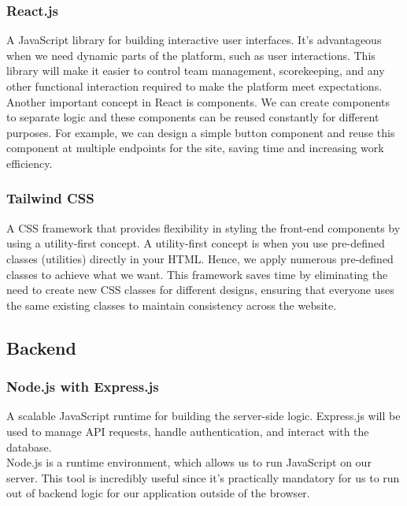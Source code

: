 \documentclass{article}
\begin{document}
\subsubsection*{React.js}

A JavaScript library for building interactive user interfaces. It's advantageous when we need dynamic parts of the platform, such as user interactions. This library will make it easier to control team management, scorekeeping, and any other functional interaction required to make the platform meet expectations. \\

\noindent Another important concept in React is components. We can create components to separate logic and these components can be reused constantly for different purposes. For example, we can design a simple button component and reuse this component at multiple endpoints for the site, saving time and increasing work efficiency.
\subsubsection*{Tailwind CSS}

A CSS framework that provides flexibility in styling the front-end components by using a utility-first concept. A utility-first concept is when you use pre-defined classes (utilities) directly in your HTML. Hence, we apply numerous pre-defined classes to achieve what we want. This framework saves time by eliminating the need to create new CSS classes for different designs, ensuring that everyone uses the same existing classes to maintain consistency across the website.

\subsection*{Backend}

\subsubsection*{Node.js with Express.js}

A scalable JavaScript runtime for building the server-side logic. Express.js will be used to manage API requests, handle authentication, and interact with the database. \\

\noindent Node.js is a runtime environment, which allows us to run JavaScript on our server. This tool is incredibly useful since it's practically mandatory for us to run out of backend logic for our application outside of the browser. \\
\end{document}
